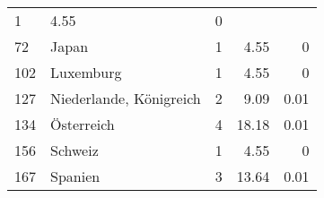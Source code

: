\begin{longtable}{lXrrr}
       \num{1} &
       \num[round-mode=places,round-precision=2]{4.55} &
         \num[round-mode=places,round-precision=2]{0} \\

     72 &
     \multicolumn{1}{X}{ Japan   } &


       \num{1} &
       \num[round-mode=places,round-precision=2]{4.55} &
         \num[round-mode=places,round-precision=2]{0} \\

     102 &
     \multicolumn{1}{X}{ Luxemburg   } &


       \num{1} &
       \num[round-mode=places,round-precision=2]{4.55} &
         \num[round-mode=places,round-precision=2]{0} \\

     127 &
     \multicolumn{1}{X}{ Niederlande, Königreich   } &


       \num{2} &
       \num[round-mode=places,round-precision=2]{9.09} &
         \num[round-mode=places,round-precision=2]{0.01} \\

     134 &
     \multicolumn{1}{X}{ Österreich   } &


       \num{4} &
       \num[round-mode=places,round-precision=2]{18.18} &
         \num[round-mode=places,round-precision=2]{0.01} \\

     156 &
     \multicolumn{1}{X}{ Schweiz   } &


       \num{1} &
       \num[round-mode=places,round-precision=2]{4.55} &
         \num[round-mode=places,round-precision=2]{0} \\

     167 &
     \multicolumn{1}{X}{ Spanien   } &


       \num{3} &
       \num[round-mode=places,round-precision=2]{13.64} &
         \num[round-mode=places,round-precision=2]{0.01} \\


\end{longtable}
